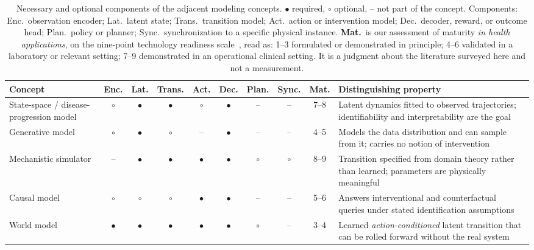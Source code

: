 \documentclass[journal]{IEEEtran}
\newif\ifsubmission
\begin{document}
\ifsubmission\else
\begin{table}[t]
\centering
\caption{Necessary and optional components of the adjacent modeling concepts. $\bullet$ required, $\circ$ optional, -- not part of the concept. Components: Enc.\ observation encoder; Lat.\ latent state; Trans.\ transition model; Act.\ action or intervention model; Dec.\ decoder, reward, or outcome head; Plan.\ policy or planner; Sync.\ synchronization to a specific physical instance. \textbf{Mat.}\ is our assessment of maturity \emph{in health applications}, on the nine-point technology readiness scale~\cite{ISO2013TRL}, read as: 1--3 formulated or demonstrated in principle; 4--6 validated in a laboratory or relevant setting; 7--9 demonstrated in an operational clinical setting. It is a judgment about the literature surveyed here and not a measurement.}
\label{tab:wm-taxonomy}
\footnotesize
\setlength{\tabcolsep}{4pt}
\renewcommand{\arraystretch}{1.15}
\begin{tabularx}{\textwidth}{>{\raggedright\arraybackslash}p{4.1cm} ccccccc c >{\raggedright\arraybackslash}X}
\toprule
\textbf{Concept} & \textbf{Enc.} & \textbf{Lat.} & \textbf{Trans.} & \textbf{Act.} & \textbf{Dec.} & \textbf{Plan.} & \textbf{Sync.} & \textbf{Mat.} & \textbf{Distinguishing property} \\
\midrule
State-space / disease-progression model & $\circ$ & $\bullet$ & $\bullet$ & $\circ$ & $\bullet$ & -- & -- & 7--8 & Latent dynamics fitted to observed trajectories; identifiability and interpretability are the goal \\
\addlinespace[2pt]
\rowcolor{tablestripe}Generative model & $\circ$ & $\bullet$ & $\circ$ & -- & $\bullet$ & -- & -- & 4--5 & Models the data distribution and can sample from it; carries no notion of intervention \\
\addlinespace[2pt]
Mechanistic simulator & -- & $\bullet$ & $\bullet$ & $\bullet$ & $\bullet$ & $\circ$ & $\circ$ & 8--9 & Transition specified from domain theory rather than learned; parameters are physically meaningful \\
\addlinespace[2pt]
\rowcolor{tablestripe}Causal model & $\circ$ & $\circ$ & $\circ$ & $\bullet$ & $\bullet$ & -- & -- & 5--6 & Answers interventional and counterfactual queries under stated identification assumptions \\
\addlinespace[2pt]
World model & $\bullet$ & $\bullet$ & $\bullet$ & $\bullet$ & $\bullet$ & $\circ$ & -- & 3--4 & Learned \emph{action-conditioned} latent transition that can be rolled forward without the real system \\

\end{tabularx}
\end{table}
\end{document}
